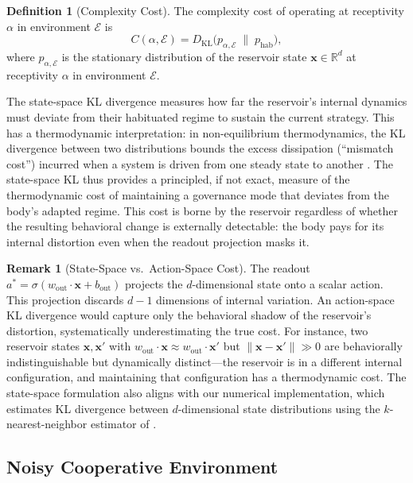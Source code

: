 \documentclass[11pt,a4paper]{article}
\theoremstyle{definition}
\newtheorem{definition}[theorem]{Definition}
\newtheorem{remark}[theorem]{Remark}
\newcommand{\R}{\mathbb{R}}
\newcommand{\KL}{D_{\mathrm{KL}}}
\newcommand{\Wout}{w_{\mathrm{out}}}
\newcommand{\xstate}{\mathbf{x}}
\newcommand{\abody}{a^{*}}
\newcommand{\bout}{b_{\mathrm{out}}}
\begin{document}
\begin{definition}[Complexity Cost]
\label{def:complexity}
The complexity cost of operating at receptivity $\alpha$ in environment
$\mathcal{E}$ is
\begin{equation}
\label{eq:complexity}
C(\alpha, \mathcal{E}) = \KL\bigl(p_{\alpha,\mathcal{E}} \;\|\; p_{\mathrm{hab}}\bigr),
\end{equation}
where $p_{\alpha,\mathcal{E}}$ is the stationary distribution of the
reservoir state $\xstate \in \R^d$ at receptivity $\alpha$ in environment
$\mathcal{E}$.
\end{definition}

The state-space KL divergence measures how far the reservoir's internal
dynamics must deviate from their habituated regime to sustain the current
strategy.  This has a thermodynamic interpretation:
in non-equilibrium thermodynamics, the KL divergence between two
distributions bounds the excess dissipation (``mismatch cost'')
incurred when a system is driven from one steady state to another
\citep{manzano2024, wolpert2024}.
The state-space KL thus provides a principled, if not exact,
measure of the thermodynamic cost of maintaining a governance mode
that deviates from the body's adapted regime.
This cost is borne by the reservoir regardless of
whether the resulting behavioral change is externally detectable: the body
pays for its internal distortion even when the readout projection masks it.

\begin{remark}[State-Space vs.\ Action-Space Cost]
\label{rem:state_vs_action}
The readout $\abody = \sigma(\Wout \cdot \xstate + \bout)$ projects the
$d$-dimensional state onto a scalar action.  This projection discards
$d - 1$ dimensions of internal variation.  An action-space KL divergence
would capture only the behavioral shadow of the reservoir's distortion,
systematically underestimating the true cost.  For instance, two reservoir
states $\xstate, \xstate'$ with $\Wout \cdot \xstate \approx \Wout \cdot \xstate'$
but $\|\xstate - \xstate'\| \gg 0$ are behaviorally indistinguishable but
dynamically distinct---the reservoir is in a different internal configuration,
and maintaining that configuration has a thermodynamic cost.
The state-space formulation also aligns with our numerical implementation,
which estimates KL divergence between $d$-dimensional state distributions
using the $k$-nearest-neighbor estimator of \citet{perezcruz2008}.
\end{remark}

\subsection{Noisy Cooperative Environment}
\end{document}
